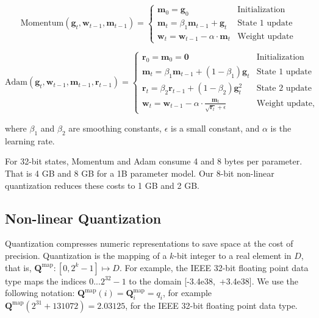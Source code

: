 \begin{equation}
   \text{Momentum}(\mathbf{g}_t,\mathbf{w}_{t-1}, \mathbf{m}_{t-1}) = 
   \begin{cases}
   \mathbf{m}_0 = \mathbf{g}_0 & \text{Initialization} \\
   \mathbf{m}_t = \beta_1\mathbf{m}_{t-1} +\mathbf{g}_t & \text{State 1 update} \\
   \mathbf{w}_t = \mathbf{w}_{t-1} - \alpha\cdot\mathbf{m}_t & \text{Weight update}
   \end{cases}
\end{equation}

\begin{equation}
   \text{Adam}(\mathbf{g}_t,\mathbf{w}_{t-1}, \mathbf{m}_{t-1}, \mathbf{r}_{t-1})= 
     \begin{cases}
   \mathbf{r}_0 = \mathbf{m}_0 = \mathbf{0} & \text{Initialization} \\
   \mathbf{m}_t = \beta_1\mathbf{m}_{t-1} + (1-\beta_1)\mathbf{g}_t & \text{State 1 update} \\
   \mathbf{r}_t = \beta_2\mathbf{r}_{t-1} + (1-\beta_2)\mathbf{g}_t^2 & \text{State 2 update} \\
   \mathbf{w}_t = \mathbf{w}_{t-1} - \alpha\cdot\frac{\mathbf{m}_t}{\sqrt{\mathbf{r}_t}+\epsilon} & \text{Weight update,}
   \end{cases}
\end{equation}

where $\beta_1$ and $\beta_2$ are smoothing constants, $\epsilon$ is a small constant, and $\alpha$ is the learning rate.

For 32-bit states, Momentum and Adam consume 4 and 8 bytes per parameter. That is 4 GB and 8 GB for a 1B parameter model. Our 8-bit non-linear quantization reduces these costs to 1 GB and 2 GB.

\subsection{Non-linear Quantization}
\label{section:nonlinearquant}

Quantization compresses numeric representations to save space at the cost of precision. Quantization is the mapping of a $k$-bit integer to a real element in $D$, that is, ${\mathbf{Q}^{\text{map}}: [0, 2^k-1] \mapsto D}$. For example, the IEEE 32-bit floating point data type maps the indices $0...2^{32}-1$ to the domain \mbox{[-3.4e38,~+3.4e38]}. We use the following notation: ${\mathbf{Q}^{\text{map}}(i) = \mathbf{Q}^{\text{map}}_i = q_i}$, for example  ${\mathbf{Q}^{\text{map}}(2^{31}+131072) = 2.03125}$, for the IEEE 32-bit floating point data type.

